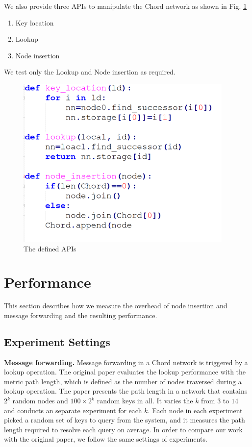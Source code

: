 \documentclass{article}
\begin{document}
We also provide three APIs to manipulate the Chord network as shown in Fig. \ref{api}
\begin{enumerate}
\item Key location
\item Lookup
\item Node insertion
\end{enumerate}
We test only the Lookup and Node insertion as required.
\begin{figure}[H]
\centering
\includegraphics[scale=1.5]{APIs.PNG}
\caption{The defined APIs
\label{api}}
\end{figure}

\section*{Performance}
This section describes how we measure the overhead of node insertion and message forwarding and the resulting performance.
\subsection*{Experiment Settings}
\textbf{Message forwarding.} Message forwarding in a Chord network is triggered by a lookup operation. The original paper evaluates the lookup performance with the metric path length, which is defined as the number of nodes traversed during a lookup operation. The paper presents the path length in a network that contains $2^k$ random nodes and $100 \times 2^k$ random keys in all. It varies the $k$ from $3$ to $14$ and conducts an separate experiment for each $k$. Each node in each experiment picked a random set of keys to query from the system, and it measures the path length required to resolve each query on average. In order to compare our work with the original paper, we follow the same settings of experiments.
\end{document}
